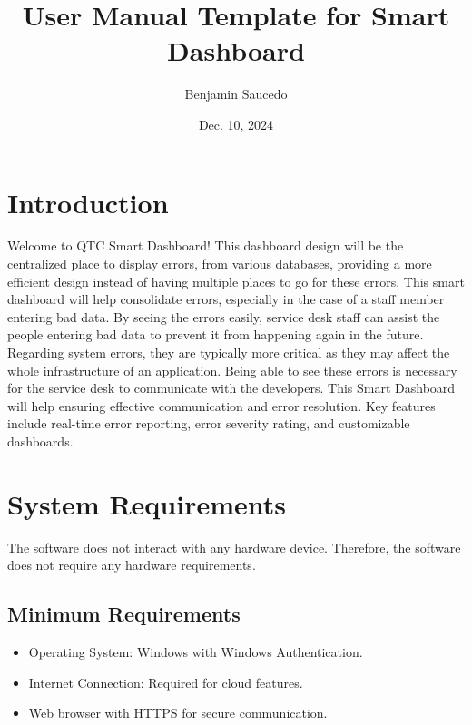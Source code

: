 \documentclass[12pt]{article}
\title{User Manual Template for Smart Dashboard}
\author{Benjamin Saucedo}
\date{Dec. 10, 2024}
\begin{document}
\maketitle
\tableofcontents
\newpage

\section{Introduction}
Welcome to QTC Smart Dashboard! This dashboard design will be the centralized place to display errors, from various databases, providing a more efficient design instead of having multiple places to go for these errors. This smart dashboard will help consolidate errors, especially in the case of a staff member entering bad data. By seeing the errors easily, service desk staff can assist the people entering bad data to prevent it from happening again in the future. Regarding system errors, they are typically more critical as they may affect the whole infrastructure of an application. Being able to see these errors is necessary for the service desk to communicate with the developers. This Smart Dashboard will help ensuring effective communication and error resolution. Key features include real-time error reporting, error severity rating, and customizable dashboards.

\section{System Requirements}
The software does not interact with any hardware device. Therefore, the software does not require any hardware requirements.

\subsection{Minimum Requirements}
\begin{itemize}
    \item Operating System: Windows with Windows Authentication.
    \item Internet Connection: Required for cloud features.
    \item Web browser with  HTTPS for secure communication.
\end{itemize}
\end{document}
